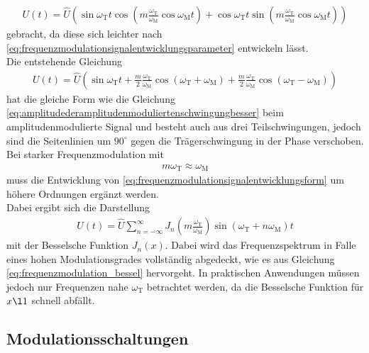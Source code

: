 \documentclass[]{scrartcl}
\begin{document}
\begin{align}
U\left(t\right)=\hat{U}\left(\sin   \omega_{\text{T}}t \cos\left(m \frac{\omega_{\text{T}}}{\omega_{\text{M}}}\cos \omega_{\text{M}}t \right)+\cos   \omega_{\text{T}}t \sin\left(m \frac{\omega_{\text{T}}}{\omega_{\text{M}}}\cos \omega_{\text{M}}t \right) \right)\label{eq:frequenzmodulationsignalentwicklungsform}
\end{align}
gebracht, da diese sich leichter nach \ref{eq:frequenzmodulationsignalentwicklungsparameter} entwickeln lässt.\\
Die entstehende Gleichung
\begin{align}
U\left(t\right)=\hat{U}\left(\sin   \omega_{\text{T}}t+ \frac{m}{2}\frac{\omega_{\text{T}}}{\omega_{\text{M}}}\cos\left(\omega_{\text{T}}+\omega_{\text{M}}\right) +\frac{m}{2}\frac{\omega_{\text{T}}}{\omega_{\text{M}}}\cos\left(\omega_{\text{T}}-\omega_{\text{M}}\right)  \right)
\end{align}
hat die gleiche Form wie die Gleichung \ref{eq:amplitudederamplitudenmoduliertenschwingungbesser} beim amplitudenmodulierte Signal und besteht auch aus drei Teilschwingungen, jedoch sind die Seitenlinien um $90^\circ$ gegen die Trägerschwingung in der Phase verschoben.\\
Bei starker Frequenzmodulation mit
\begin{align}
m \omega_{\text{T}} \approx \omega_{\text{M}}
\end{align}
muss die Entwicklung von \ref{eq:frequenzmodulationsignalentwicklungsform} um höhere Ordnungen ergänzt werden.\\
Dabei ergibt sich die Darstellung
\begin{align}
U\left(t\right)=\hat{U}\sum\limits_{n=-\infty}^{\infty} J_n\left(m\frac{\omega_{\text{T}}}{\omega_{\text{M}}} \right)\sin \left(\omega_{\text{T}}+n\omega_{\text{M}}\right)t\label{eq:frequenzmodulation_bessel}
\end{align}
mit der Besselsche Funktion $J_n\left(x\right)$. Dabei wird das Frequenzspektrum in Falle eines hohen Modulationsgrades vollständig abgedeckt, wie es aus Gleichung \ref{eq:frequenzmodulation_bessel} hervorgeht. In praktischen Anwendungen müssen jedoch nur Frequenzen nahe $\omega_{\text{T}}$ betrachtet werden, da die Besselsche Funktion für $x\l 1$ schnell abfällt.   
\subsection{Modulationsschaltungen}
\end{document}
